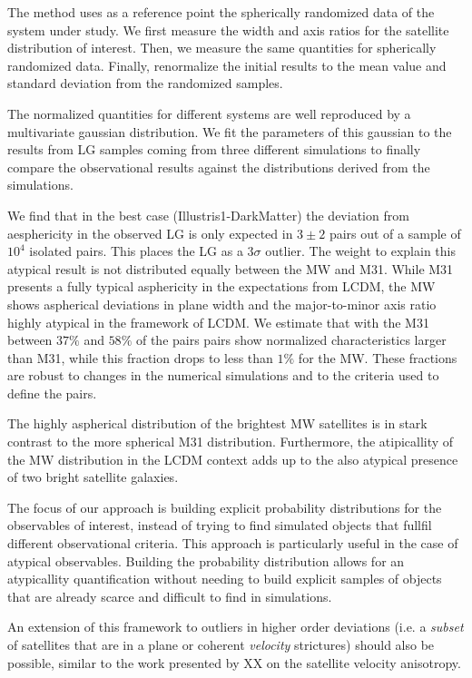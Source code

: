 \documentclass[a4paper,fleqn,usenatbib]{mnras}
\begin{document}
The method uses as a reference point the spherically randomized data
of the system under study.
We first measure the width and axis ratios for the satellite
distribution of interest. 
Then, we measure the same quantities for spherically
randomized data. 
Finally, renormalize the initial results to the mean value and
standard deviation from the randomized samples.  

The normalized quantities for different systems are well reproduced by
a multivariate gaussian distribution. 
We fit the parameters of this gaussian to the results from 
LG samples coming from three different simulations
to finally compare the observational results against the distributions
derived from the simulations.


We find that in the best case (Illustris1-DarkMatter) the deviation
from aesphericity in the observed LG is only  expected in $3\pm2$
pairs out of a sample of $10^4$ isolated pairs. This places the LG as
a $3\sigma$ outlier.   
The weight to explain this atypical result is not distributed equally
between the MW and M31. 
While M31 presents a fully typical asphericity in the expectations
from LCDM, the MW shows aspherical deviations in plane width and the
major-to-minor axis ratio highly atypical in the 
framework of LCDM. 
We estimate that with the M31 between $37\%$ and $58\%$ of the pairs
pairs show normalized characteristics larger than M31, while
this fraction drops to less than $1\%$ for the MW.
These fractions are robust to changes in the numerical simulations and to
the criteria used to define the pairs.


The highly aspherical distribution of the brightest MW satellites is
in stark contrast to the more spherical M31 distribution.
Furthermore, the atipicallity of the MW distribution in the LCDM
context adds up to the also atypical presence of two bright satellite
galaxies.


The focus of our approach is building explicit probability
distributions for the observables of interest, instead of trying to
find simulated objects that fullfil different observational criteria. 
This approach is particularly useful in the case of atypical
observables. 
Building the probability distribution allows for an atypicallity
quantification without needing to build explicit samples of objects
that are already scarce and difficult to find in simulations.

An extension of this framework to outliers in higher order deviations
(i.e. a \emph{subset} of satellites that are in a plane or
coherent \emph{velocity} strictures) should also be possible, similar
to the work presented by XX on the satellite velocity anisotropy.
\end{document}
